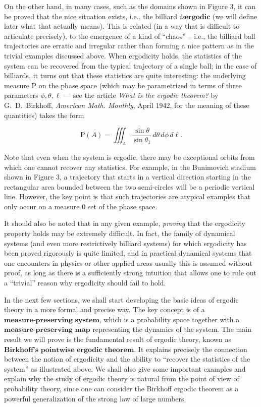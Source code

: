 \documentclass[11pt]{report}
\theoremstyle{plain}
\theoremstyle{definition}
\begin{document}
\noindent On the other hand, in many cases, such as the domains
shown in Figure 3, it can be proved that the nice
situation exists, i.e., the billiard \emph{is}$\textbf{ergodic}$ (we will define later what that
actually means). This is related (in a way that is
difficult to articulate precisely), to the emergence
of a kind of ``chaos'' -- i.e., the billiard ball
trajectories are erratic and irregular rather than
forming a nice pattern as in the trivial examples
discussed above. When ergodicity holds, the statistics
of the system can be recovered from the typical
trajectory of a single ball; in the case of billiards,
it turns out that these statistics are quite
interesting: the underlying measure $\mathrm{P}$ on
the phase space (which may be parametrized in terms of
three parameters $\phi, \theta, \ell$ --- see the
article \emph{What is the ergodic theorem?} by
G.~D.~Birkhoff, \emph{American Math. Monthly}, April 1942,
for the meaning of these quantities) takes the form

\[
\mathrm{P}(A) = \iiint_A \frac{\sin \theta}{\sin\theta_1} \,d\theta\,d\phi\,d\ell.
\]

\noindent Note that even when the system is ergodic, there may
be exceptional orbits from which one cannot recover
any statistics. For example, in the Bunimovich stadium
shown in Figure 3, a trajectory that starts in a
vertical direction starting in the rectangular area
bounded between the two semi-circles will be a
periodic vertical line. However, the key point is that
such trajectories are atypical examples that only
occur on a measure 0 set of the phase space.

It should also be noted that in any given example,
\emph{proving} that the ergodicity property holds may be
extremely difficult. In fact, the family of dynamical
systems (and even more restrictively billiard systems)
for which ergodicity has been proved rigorously is
quite limited, and in practical dynamical systems that
one encounters in physics or other applied areas
usually this is assumed without proof, as long as
there is a sufficiently strong intuition that allows
one to rule out a ``trivial'' reason why ergodicity
should fail to hold.

In the next few sections, we shall start developing
the basic ideas of ergodic theory in a more formal and
precise way. The key concept is of a
$\textbf{measure-preserving system}$, which is a
probability space together with a
$\textbf{measure-preserving map}$ representing the
dynamics of the system. The main result we will prove
is the fundamental result of ergodic theory, known as
$\textbf{Birkhoff's pointwise ergodic theorem}$. It
explains precisely the connection between the notion
of ergodicity and the ability to ``recover the
statistics of the system'' as illustrated above. We
shall also give some important examples and explain
why the study of ergodic theory is natural from the
point of view of probability theory, since one can
consider the Birkhoff ergodic theorem as a powerful
generalization of the strong law of large numbers.
\end{document}
